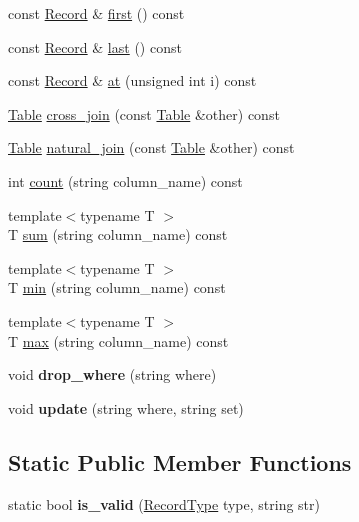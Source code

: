 \begin{DoxyCompactItemize}
const \hyperlink{class_record}{Record} \& \hyperlink{class_table_a641c5957ec95abc233450a447c34b820}{first} () const 
\item 
const \hyperlink{class_record}{Record} \& \hyperlink{class_table_afb08a45913f50106dc16388579897134}{last} () const 
\item 
const \hyperlink{class_record}{Record} \& \hyperlink{class_table_a7f27c65febdd226b6973ea082863e0ee}{at} (unsigned int i) const 
\item 
\hyperlink{class_table}{Table} \hyperlink{class_table_a85c83b9f8eeba7cfc7373611297f2194}{cross\-\_\-join} (const \hyperlink{class_table}{Table} \&other) const 
\item 
\hyperlink{class_table}{Table} \hyperlink{class_table_afc179505ae7fdf06d2ec5564a24817dc}{natural\-\_\-join} (const \hyperlink{class_table}{Table} \&other) const 
\item 
int \hyperlink{class_table_a98e0ec7a2a729d9dc5f4de0324e021f5}{count} (string column\-\_\-name) const 
\item 
{\footnotesize template$<$typename T $>$ }\\T \hyperlink{class_table_ab00659a94da98ec7bd60a8a711b2ec77}{sum} (string column\-\_\-name) const 
\item 
{\footnotesize template$<$typename T $>$ }\\T \hyperlink{class_table_a2a4882f99726fba725314e2625ed37ae}{min} (string column\-\_\-name) const 
\item 
{\footnotesize template$<$typename T $>$ }\\T \hyperlink{class_table_abb7aff3403f246965d7557ab592110dd}{max} (string column\-\_\-name) const 
\item 
\hypertarget{class_table_ac6934afdb79cdb140098e0b4fa24acf6}{void {\bfseries drop\-\_\-where} (string where)}\label{class_table_ac6934afdb79cdb140098e0b4fa24acf6}

\item 
\hypertarget{class_table_ad4d6110f8a2d020c4f360cb23554357b}{void {\bfseries update} (string where, string set)}\label{class_table_ad4d6110f8a2d020c4f360cb23554357b}

\end{DoxyCompactItemize}
\subsection*{Static Public Member Functions}
\begin{DoxyCompactItemize}
\item 
\hypertarget{class_table_a9e6d226580485a3eb54ed77dbd09c318}{static bool {\bfseries is\-\_\-valid} (\hyperlink{class_table_af8f9ec96ecaa35a2e65312b74ddfeae6}{Record\-Type} type, string str)}\label{class_table_a9e6d226580485a3eb54ed77dbd09c318}

\end{DoxyCompactItemize}


